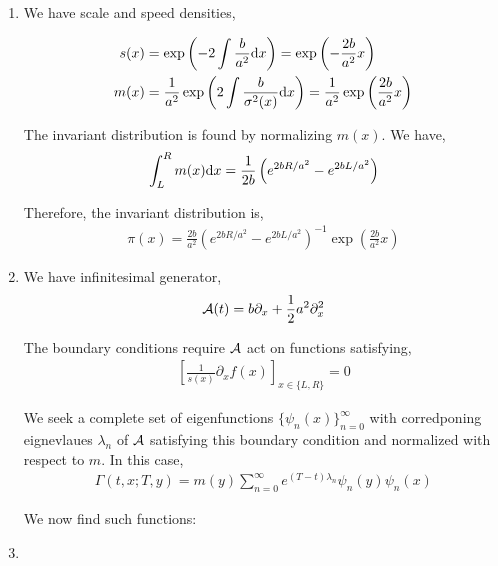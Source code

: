 \begin{solution}[Solution]
\begin{enumerate}[label=(\alph*)]
    \item We have scale and speed densities,

        \begin{align*}
            s(x) &= \exp \left( -2\int \frac{b}{a^2}\mathrm{d} x \right)
            = \exp \left( -\frac{2b}{a^2} x \right)
            \\
            m(x) &= \frac{1}{a^2}\exp \left( 2\int \frac{b}{\sigma^2(x)}\mathrm{d} x \right)
            = \frac{1}{a^2} \exp \left( \frac{2b}{a^2} x \right)
        \end{align*}

        The invariant distribution is found by normalizing \( m(x) \). We have,
        \begin{align*}
            \int_L^R m(x) \mathrm{d} x =
            \frac{1}{2b} \left( e^{2bR/a^2} - e^{2bL/a^2} \right)
        \end{align*}
        
        Therefore, the invariant distribution is,
        \begin{align*}
            \pi(x) = \frac{2b}{a^2} \left( e^{2bR/a^2} - e^{2bL/a^2} \right)^{-1} \exp \left( \frac{2b}{a^2}x \right) 
        \end{align*}
        


        
        
    \item We have infinitesimal generator,
        \begin{align*}
            \mathcal{A}(t) = b\partial_x + \frac{1}{2}a^2\partial_x^2 
        \end{align*}

        The boundary conditions require \( \mathcal{A} \) act on functions satisfying,
        \begin{align*}
            \left[\frac{1}{s(x)}\partial_x f(x) \right]_{x\in\{L,R\}} = 0
        \end{align*}

        We seek a complete set of eigenfunctions \( \{\psi_n(x)\}_{n=0}^{\infty} \) with corredponing eignevlaues \( \lambda_n \) of \( \mathcal{A} \) satisfying this boundary condition and normalized with respect to \( m \). In this case,
        \begin{align*}
            \Gamma(t,x;T,y) = m(y) \sum_{n=0}^{\infty} e^{(T-t) \lambda_n}\psi_n(y)\psi_n(x)
        \end{align*}
       

        We now find such functions:
       
       
    \item
\end{enumerate}
\end{solution}

